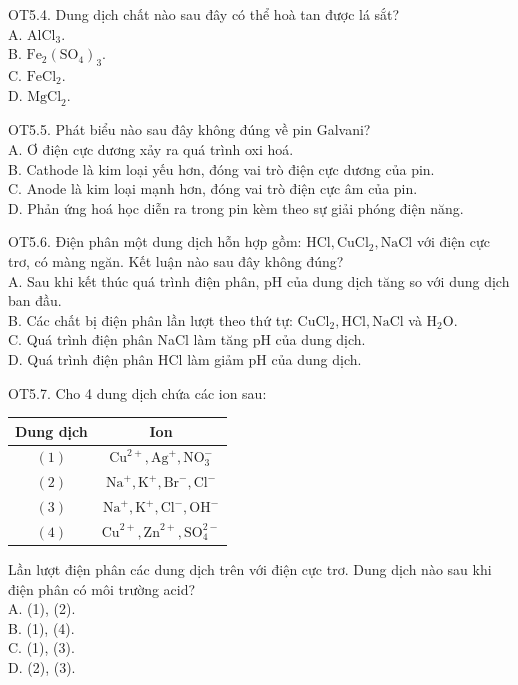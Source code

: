 \documentclass[10pt]{article}
\begin{document}
OT5.4. Dung dịch chất nào sau đây có thể hoà tan được lá sắt?\\
A. $\mathrm{AlCl}_{3}$.\\
B. $\mathrm{Fe}_{2}\left(\mathrm{SO}_{4}\right)_{3}$.\\
C. $\mathrm{FeCl}_{2}$.\\
D. $\mathrm{MgCl}_{2}$.

OT5.5. Phát biểu nào sau đây không đúng về pin Galvani?\\
A. Ơ điện cực dương xảy ra quá trình oxi hoá.\\
B. Cathode là kim loại yếu hơn, đóng vai trò điện cực dương của pin.\\
C. Anode là kim loại mạnh hơn, đóng vai trò điện cực âm của pin.\\
D. Phản ứng hoá học diễn ra trong pin kèm theo sự giải phóng điện năng.

OT5.6. Điện phân một dung dịch hỗn hợp gồm: $\mathrm{HCl}, \mathrm{CuCl}_{2}, \mathrm{NaCl}$ với điện cực trơ, có màng ngăn. Kết luận nào sau đây không đúng?\\
A. Sau khi kết thúc quá trình điện phân, pH của dung dịch tăng so với dung dịch ban đầu.\\
B. Các chất bị điện phân lần lượt theo thứ tự: $\mathrm{CuCl}_{2}, \mathrm{HCl}, \mathrm{NaCl}$ và $\mathrm{H}_{2} \mathrm{O}$.\\
C. Quá trình điện phân NaCl làm tăng pH của dung dịch.\\
D. Quá trình điện phân HCl làm giảm pH của dung dịch.

OT5.7. Cho 4 dung dịch chứa các ion sau:

\begin{center}
\begin{tabular}{|c|c|}
\hline
Dung dịch & Ion \\
\hline
$(1)$ & $\mathrm{Cu}^{2+}, \mathrm{Ag}^{+}, \mathrm{NO}_{3}^{-}$ \\
\hline
$(2)$ & $\mathrm{Na}^{+}, \mathrm{K}^{+}, \mathrm{Br}^{-}, \mathrm{Cl}^{-}$ \\
\hline
$(3)$ & $\mathrm{Na}^{+}, \mathrm{K}^{+}, \mathrm{Cl}^{-}, \mathrm{OH}^{-}$ \\
\hline
$(4)$ & $\mathrm{Cu}^{2+}, \mathrm{Zn}^{2+}, \mathrm{SO}_{4}^{2-}$ \\
\hline
\end{tabular}
\end{center}

Lần lượt điện phân các dung dịch trên với điện cực trơ. Dung dịch nào sau khi điện phân có môi trường acid?\\
A. (1), (2).\\
B. (1), (4).\\
C. (1), (3).\\
D. (2), (3).
\end{document}
